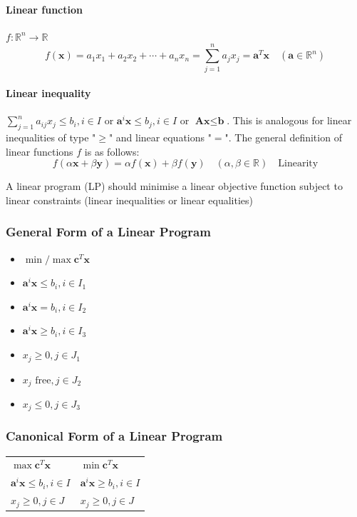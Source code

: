 \documentclass[11pt]{article}
\begin{document}
\paragraph{Linear function} $f: \mathbb{R}^n\rightarrow\mathbb{R}$
\begin{equation*}
	f(\textbf{x}) = a_1 x_1+a_2 x_2+\cdots+a_n x_n = \sum_{j=1}^{n} a_j x_j = \textbf{a}^T\textbf{x}\quad(\textbf{a}\in\mathbb{R}^n)
\end{equation*}

\paragraph{Linear inequality} $\sum_{j=1}^{n}a_{ij}x_j\leq b_{i}, i\in I$ or $\textbf{a}^i\textbf{x}\leq b_j, i\in I$ or $\textbf{A}\textbf{x}\leq\textbf{b}$. This is analogous for linear inequalities of type "$\geq$" and linear equations "$=$". The general definition of linear functions $f$ is as follows:
\begin{equation*}
	f(\alpha\textbf{x} + \beta\textbf{y}) = \alpha f(\textbf{x})+\beta f(\textbf{y})\quad (\alpha,\beta\in\mathbb{R})\quad\text{Linearity}
\end{equation*}

\noindent
A linear program (LP) should minimise a linear objective function subject to linear constraints (linear inequalities or linear equalities)


\subsubsection{General Form of a Linear Program}
\begin{itemize}[label=,noitemsep,nosep, leftmargin=0.25cm]
	\item $ \min/\max \textbf{c}^T\textbf{x} $
	\item $ \textbf{a}^i\textbf{x}\leq b_i, i\in I_1 $
	\item $ \textbf{a}^i\textbf{x} = b_i, i\in I_2 $
	\item $ \textbf{a}^i\textbf{x}\geq b_i, i\in I_3 $
	\item $ x_j \geq 0, j\in J_1 $
	\item $ x_j \text{ free}, j\in J_2 $
	\item $ x_j \leq 0, j\in J_3 $
\end{itemize}

\subsubsection{Canonical Form of a Linear Program}
\begin{tabularx}{\linewidth}{p{0.5\linewidth} p{0.5\linewidth}}
	$\max \textbf{c}^T \textbf{x}$ & $\min \textbf{c}^T \textbf{x}$\\
	$ \textbf{a}^i\textbf{x} \leq b_i, i\in I $ & $ \textbf{a}^i\textbf{x} \geq b_i, i\in I $\\
	$ x_j \geq 0, j\in J $ & $ x_j \geq 0, j\in J $
\end{tabularx}
\end{document}
